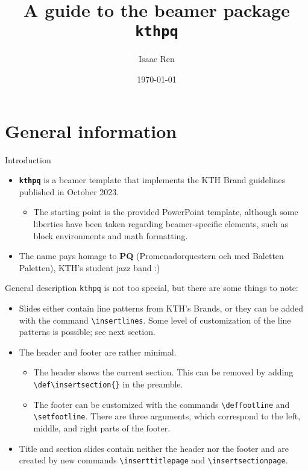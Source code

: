 \documentclass[17pt, t, lualatex]{beamer}
\title{A guide to the beamer package \texttt{kthpq}}
\date{\today}
\institute[KTH]{KTH Royal Institute of Technology}
\author[Isaac Ren]{Isaac Ren}
\renewcommand*{\emph}[1]{{\color{digital blue} \bfseries #1}}
\def\kthpq{\texttt{kthpq}}
\begin{document}
\inserttitlepage[center]

\begin{frame}
\tableofcontents
\end{frame}

\section{General information}

\insertsectionpage

\begin{frame}{Introduction}
\begin{itemize}
\item \emph{\kthpq{}} is a beamer template that implements the KTH Brand guidelines published in October 2023.
\begin{itemize}
\item The starting point is the provided PowerPoint template, although some liberties have been taken regarding beamer-specific elements, such as block environments and math formatting.
\end{itemize}
\item The name pays homage to \emph{PQ} (Promenadorquestern och med Baletten Paletten), KTH's student jazz band :)
\end{itemize}
\end{frame}

\begin{frame}[fragile=singleslide]{General description}
\kthpq{} is not too special, but there are some things to note:
\begin{itemize}
\item Slides either contain line patterns from KTH's Brands, or they can be added with the command \verb|\insertlines|. Some level of customization of the line patterns is possible; see next section.
\item The header and footer are rather minimal.
\begin{itemize}
\item The header shows the current section. This can be removed by adding \verb|\def\insertsection{}| in the preamble.
\item The footer can be customized with the commands \verb|\deffootline| and \verb|\setfootline|. There are three arguments, which correspond to the left, middle, and right parts of the footer.
\end{itemize}
\item Title and section slides contain neither the header nor the footer and are created by new commands \verb|\inserttitlepage| and \verb|\insertsectionpage|.
\end{itemize}
\end{frame}
\end{document}
